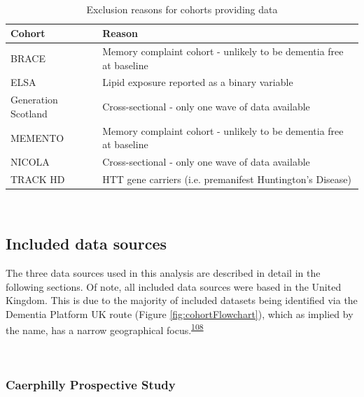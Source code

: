 \documentclass[a4paper, twoside]{templates/ociamthesis}
\begin{document}
~\\




\begin{table}[H]

\caption[Exclusion reasons for cohorts providing data]{\label{tab:dataExcluded-table}Exclusion reasons for cohorts providing data}
\centering
\begin{tabular}[t]{>{\raggedright\arraybackslash}p{12em}>{\raggedright\arraybackslash}p{20em}}
\toprule
\textbf{Cohort} & \textbf{Reason}\\
\midrule
BRACE & Memory complaint cohort - unlikely to be dementia free at baseline\\
\midrule
ELSA & Lipid exposure reported as a binary variable\\
\midrule
Generation Scotland & Cross-sectional - only one wave of data available\\
\midrule
MEMENTO & Memory complaint cohort - unlikely to be dementia free at baseline\\
\midrule
NICOLA & Cross-sectional - only one wave of data available\\
\midrule
\addlinespace
TRACK HD & HTT gene carriers (i.e. premanifest Huntington's Disease)\\
\bottomrule
\end{tabular}
\end{table}

~

\hypertarget{included-data-sources}{%
\subsection{Included data sources}\label{included-data-sources}}

The three data sources used in this analysis are described in detail in the following sections. Of note, all included data sources were based in the United Kingdom. This is due to the majority of included datasets being identified via the Dementia Platform UK route (Figure \ref{fig:cohortFlowchart}), which as implied by the name, has a narrow geographical focus.\textsuperscript{\protect\hyperlink{ref-bauermeister2020}{108}}

~

\hypertarget{caerphilly-prospective-study}{%
\subsubsection{Caerphilly Prospective Study}\label{caerphilly-prospective-study}}
\end{document}
